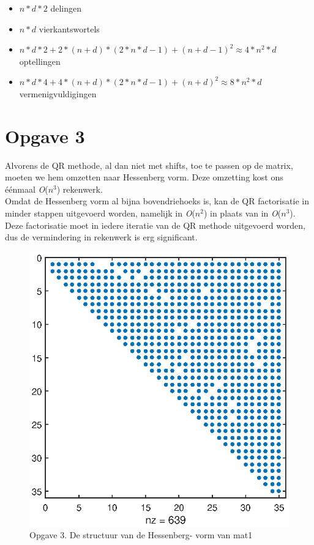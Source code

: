 \documentclass[]{article}
\newcommand{\opgave}[1]{\pagebreak\section*{Opgave #1}}
\begin{document}
\begin{itemize}
  \item $n*d*2$ delingen
  \item $n*d$ vierkantswortels
  \item $n*d*2 + 2*(n+d)*(2*n*d-1) + (n+d-1)^2 \approx 4*n^2*d$ optellingen
  \item $n*d*4 + 4*(n+d)*(2*n*d-1) + (n+d)^2 \approx 8*n^2*d$ vermenigvuldigingen
\end{itemize}


\opgave{3}
Alvorens de QR methode, al dan niet met shifts, toe te passen op de matrix, moeten we hem omzetten naar Hessenberg vorm. Deze omzetting kost ons \'{e}\'{e}nmaal \textit{O}($n^3$) rekenwerk. \\
Omdat de Hessenberg vorm al bijna bovendriehoeks is, kan de QR factorisatie in minder stappen uitgevoerd worden, namelijk in \textit{O}($n^2$) in plaats van in \textit{O}($n^3$). Deze factorisatie moet in iedere iteratie van de QR methode uitgevoerd worden, dus  de vermindering in rekenwerk is erg significant. 

\begin{figure}
\begin{center}
\includegraphics[width=1\textwidth]{opgave3.eps}
\end{center}
\caption{Opgave 3. De structuur van de Hessenberg- vorm van mat1}
\end{figure}
\end{document}
